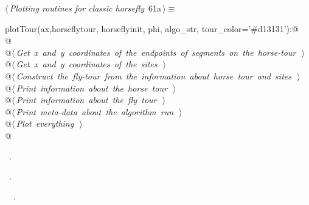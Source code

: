 \documentclass[11.5pt]{report}
\begin{document}
\begin{flushleft} \small\label{scrap83}\raggedright\small
{} $\langle\,${\itshape Plotting routines for classic horsefly}\nobreak\ {\footnotesize {61a}}$\,\rangle\equiv$
\vspace{-1ex}
\begin{list}{}{} \item
\mbox{}\verb@def plotTour(ax,horseflytour, horseflyinit, phi, algo_str, tour_color='#d13131'):@\\
\mbox{}\verb@   @\\
\mbox{}\verb@    @\hbox{$\langle\,${\itshape Get x and y coordinates of the endpoints of segments on the horse-tour}\nobreak\ {\footnotesize {}}$\,\rangle$}\verb@@\\
\mbox{}\verb@    @\hbox{$\langle\,${\itshape Get x and y coordinates of the sites}\nobreak\ {\footnotesize {}}$\,\rangle$}\verb@@\\
\mbox{}\verb@    @\hbox{$\langle\,${\itshape Construct the fly-tour from the information about horse tour and sites}\nobreak\ {\footnotesize {}}$\,\rangle$}\verb@@\\
\mbox{}\verb@    @\hbox{$\langle\,${\itshape Print information about the horse tour}\nobreak\ {\footnotesize {}}$\,\rangle$}\verb@@\\
\mbox{}\verb@    @\hbox{$\langle\,${\itshape Print information about the fly tour}\nobreak\ {\footnotesize {}}$\,\rangle$}\verb@@\\
\mbox{}\verb@    @\hbox{$\langle\,${\itshape Print meta-data about the algorithm run}\nobreak\ {\footnotesize {}}$\,\rangle$}\verb@@\\
\mbox{}\verb@    @\hbox{$\langle\,${\itshape Plot everything}\nobreak\ {\footnotesize {}}$\,\rangle$}\verb@@\\
\mbox{}\verb@    @{\NWsep}
\end{list}
\vspace{-1.5ex}
\footnotesize
\begin{list}{}{\setlength{\itemsep}{-\parsep}\setlength{\itemindent}{-\leftmargin}}
\item \NWtxtMacroDefBy\ .
\item \NWtxtMacroRefIn\ .
\item \NWtxtIdentsDefed\nobreak\  \verb@plotTour@\nobreak\ .
\item{}
\end{list}
\vspace{4ex}
\end{flushleft}
\end{document}
